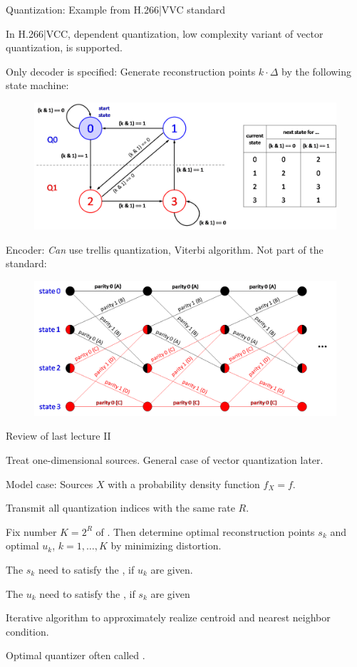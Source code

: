 \begin{frame}{Quantization: Example from H.266|VVC standard}
\bit
\item In H.266|VCC, dependent quantization, low complexity variant of vector quantization, is supported.
\item Only decoder is specified: Generate reconstruction points $k\cdot\Delta$ by the following  state machine:
\begin{figure}
\includegraphics[width=.40\textwidth]{Quant_II/DepQuant.png}
\end{figure}
\item Encoder: \textit{Can} use trellis quantization, Viterbi algorithm. Not 
part of the standard:
\begin{figure}
\includegraphics[width=.30\textwidth]{Quant_II/trellis.png}
\end{figure}
\eit
\end{frame}

\begin{frame}{Review of last lecture II}
\bit
\item  Treat one-dimensional sources. General case of vector quantization later.  
\item Model case: Sources $X$ with a probability density function $f_X=f$. 
\eit

\bit
\item Transmit all quantization indices with the same rate $R$.
\item [\iarrow] Fix number  $K=2^R$ of . Then  determine optimal reconstruction points $s_k$ and optimal  
$u_k$, $k=1,\dots,K$  by minimizing distortion.   
\item The $s_k$ need to satisfy the , if $u_k$ are given. 
\item The $u_k$ need to satisfy the , if $s_k$ are given 
\item {} Iterative algorithm to approximately realize centroid and nearest neighbor condition.
\item Optimal quantizer often called .
\eit
{} 
\end{frame}

